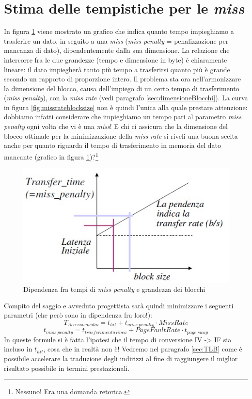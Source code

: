\section{Stima delle tempistiche per le \textit{miss}}
\label{sec:tempiMiss}

In figura \ref{fig:misspenalty} viene mostrato un grafico che indica quanto tempo impieghiamo a trasferire un dato, in seguito a una \textit{miss} (\textit{miss penalty} = penalizzazione per mancanza di dato), dipendentemente dalla sua dimensione.
La relazione che intercorre fra le due grandezze (tempo e dimensione in byte) è chiaramente lineare: il dato impiegherà tanto più tempo a trasferirsi quanto più è grande secondo un rapporto di proporzione intero.
Il problema sta ora nell'armonizzare la dimensione del blocco, causa dell'impiego di un certo tempo di trasferimento (\textit{miss penalty}), con la \textit{miss rate} (vedi paragrafo \ref{sec:dimensioneBlocchi}). La curva in figura \ref{fig:missrateblocksize} non è quindi l'unica alla quale prestare attenzione: dobbiamo infatti considerare che impieghiamo un tempo pari al parametro \textit{miss penalty} ogni volta che vi è una \textit{miss}! E chi ci assicura che la dimensione del blocco ottimale per la minimizzazione della \textit{miss rate} si riveli una buona scelta anche per quanto riguarda il tempo di trasferimento in memoria del dato mancante (grafico in figura \ref{fig:misspenalty})?\footnote{Nessuno! Era una domanda retorica.}

\begin{figure}[!h]
\centering
\includegraphics[width=0.5\columnwidth]{img/misspenalty}
\caption{Dipendenza fra tempi di \textit{miss penalty} e grandezza dei blocchi}
\label{fig:misspenalty}
\end{figure}

Compito del saggio e avveduto progettista sarà quindi minimizzare i seguenti parametri (che però sono in dipendenza fra loro!):
\[
T_{Accesso~ medio} = t_{hit} + t_{miss~penalty} \cdot MissRate
\]
\[
t_{miss~penalty} = t_{trasferimento~linea} + PageFaultRate \cdot t_{page~swap}
\]
In queste formule si è fatta l'ipotesi che il tempo di conversione IV -> IF sia incluso in $t_{hit}$, cosa che in realtà non è! Vedremo nel paragrafo \ref{sec:TLB} come è possibile accelerare la traduzione degli indirizzi al fine di raggiungere il miglior risultato possibile in termini prestazionali.


